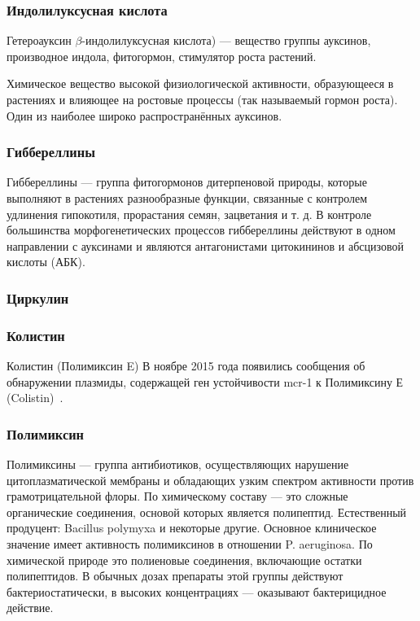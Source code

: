 \documentclass[11pt]{article}
\begin{document}
	\subsubsection{Индолилуксусная кислота}
	Гетероауксин $\beta$-индолилуксусная кислота) — вещество группы ауксинов, производное индола, фитогормон, стимулятор роста растений.
	
	Химическое вещество высокой физиологической активности, образующееся в растениях и влияющее на ростовые процессы (так называемый гормон роста). Один из наиболее широко распространённых ауксинов.
	
	\subsubsection{Гиббереллины}
	Гиббереллины — группа фитогормонов дитерпеновой природы, которые выполняют в растениях разнообразные функции, связанные с контролем удлинения гипокотиля, прорастания семян, зацветания и т. д. В контроле большинства морфогенетических процессов гиббереллины действуют в одном направлении с ауксинами и являются антагонистами цитокининов и абсцизовой кислоты (АБК). ~\cite{GB_1}
	
	\subsubsection{Циркулин}
	
	\subsubsection{Колистин}
		Колистин (Полимиксин E)
	В ноябре 2015 года появились сообщения об обнаружении плазмиды, содержащей ген устойчивости mcr-1 к Полимиксину Е (Colistin)~\cite{Colistin_1}.
	
	\subsubsection{Полимиксин}
	Полимиксины — группа антибиотиков, осуществляющих нарушение цитоплазматической мембраны и обладающих узким спектром активности против грамотрицательной флоры. По химическому составу — это сложные органические соединения, основой которых является полипептид. Естественный продуцент: Bacillus polymyxa и некоторые другие. Основное клиническое значение имеет активность полимиксинов в отношении P. aeruginosa. По химической природе это полиеновые соединения, включающие остатки полипептидов. В обычных дозах препараты этой группы действуют бактериостатически, в высоких концентрациях — оказывают бактерицидное действие.
	
\end{document}
